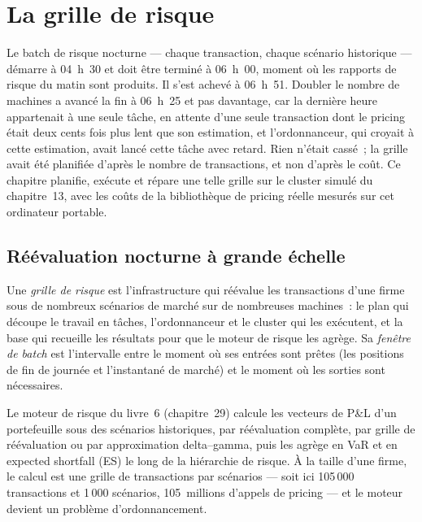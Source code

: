 \chapter{La grille de risque}\label{ch:pl:the-risk-grid}

Le batch de risque nocturne --- chaque transaction, chaque scénario historique --- démarre à 04~h~30 et doit être terminé à 06~h~00, moment où les rapports de risque du matin
sont produits. Il s'est achevé à 06~h~51. Doubler le nombre de machines a avancé la fin à 06~h~25 et pas davantage, car la dernière heure appartenait à
une seule tâche, en attente d'une seule transaction dont le pricing était deux cents fois plus lent que son estimation, et l'ordonnanceur, qui croyait à cette estimation,
avait lancé cette tâche avec retard. Rien n'était cassé~; la grille avait été planifiée d'après le nombre de transactions, et non d'après le coût. Ce chapitre planifie, exécute et répare
une telle grille sur le cluster simulé du chapitre~13, avec les coûts de la bibliothèque de pricing réelle mesurés sur cet ordinateur portable.

\section{Réévaluation nocturne à grande échelle}

\begin{definition}\label{def:pl:the-risk-grid:grid}
Une \emph{grille de risque} est l'infrastructure qui réévalue les transactions d'une firme sous de nombreux scénarios de marché sur de nombreuses machines~: le
plan qui découpe le travail en tâches, l'ordonnanceur et le cluster qui les exécutent, et la base qui recueille les résultats pour que le moteur de risque les agrège. Sa
\emph{fenêtre de batch} est l'intervalle entre le moment où ses entrées sont prêtes (les positions de fin de journée et
l'instantané de marché) et le moment où les sorties sont nécessaires.
\end{definition}

Le moteur de risque du livre~6 (chapitre~29) calcule les vecteurs de P\&L d'un portefeuille sous des scénarios historiques, par réévaluation complète, par grille de réévaluation ou par
approximation delta--gamma, puis les agrège en VaR et en expected shortfall (ES) le long de la hiérarchie de risque. À la taille d'une firme, le
calcul est une grille de transactions par scénarios --- soit ici 105\,000 transactions et 1\,000 scénarios, 105~millions d'appels de pricing --- et le moteur
devient un problème d'ordonnancement.

